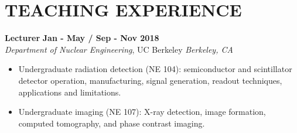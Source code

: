 \section{\small{TEACHING EXPERIENCE}}

\textbf{Lecturer} \hfill \textbf{Jan - May / Sep - Nov 2018} \\
\textsl{Department of Nuclear Engineering}, UC Berkeley \hfill \textsl{Berkeley, CA}\\[-2.8ex]
\begin{itemize}[leftmargin=4ex] \itemsep -2pt
    \item Undergraduate radiation detection (NE 104): semiconductor and scintillator detector operation, manufacturing, signal generation, readout techniques, applications and limitations.
    \item Undergraduate imaging (NE 107): X-ray detection, image formation, computed tomography, and phase contrast imaging.
\end{itemize}


